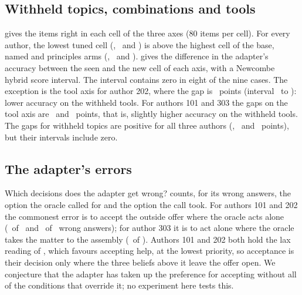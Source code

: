 \subsection{Withheld topics, combinations and tools}\label{sec:cells}

 gives the items right in each cell of the three axes (80 items per cell). For
every author, the lowest tuned cell (\MinTunedCellA, \MinTunedCellB\ and \MinTunedCellC) is above the highest cell
of the base, named and principles arms (\MaxPromptedCellA, \MaxPromptedCellB\ and \MaxPromptedCellC).
 gives the difference in the adapter's accuracy between the seen and the new
cell of each axis, with a Newcombe hybrid score interval. The
interval contains zero in eight of the nine cases. The exception is the tool axis for author 202, where
the gap is \GapBTool\ points (interval \GapLoBTool\ to \GapHiBTool): lower accuracy on the withheld tools. For
authors 101 and 303 the gaps on the tool axis are \GapATool\ and \GapCTool\ points, that is, slightly higher accuracy on the withheld tools. The gaps for withheld topics
are positive for all three authors (\GapATopic, \GapBTopic\ and \GapCTopic\ points), but their intervals include zero.

\begin{table}[t]
\centering\footnotesize

\caption{Items right in each cell of the three axes (80 items per cell).}
\label{tab:cells}
\end{table}

\begin{table}[t]
\centering\small

\caption{Adapter accuracy on the seen cell minus the new cell, in points, with a 95\% Newcombe
interval, for each axis; positive means worse on the withheld cell.}
\label{tab:gaps}
\end{table}

\subsection{The adapter's errors}\label{sec:errors}

Which decisions does the adapter get wrong?  counts, for its wrong answers,
the option the oracle called for and the option the call took. For authors 101 and 202 the
commonest error is to accept the outside offer where the oracle acts alone
(\OfferForAloneA\ of \WrongATuned\ and \OfferForAloneB\ of \WrongBTuned\ wrong answers); for
author 303 it is to act alone where the oracle takes the matter to the assembly
(\AloneForAssemblyC\ of \WrongCTuned). Authors 101 and 202 both hold the lax reading of
, which favours accepting help, at the lowest priority, so acceptance is
their decision only where the three beliefs above it leave the offer open. We conjecture that
the adapter has taken up the preference for accepting without all of the conditions that
override it; no experiment here tests this.

